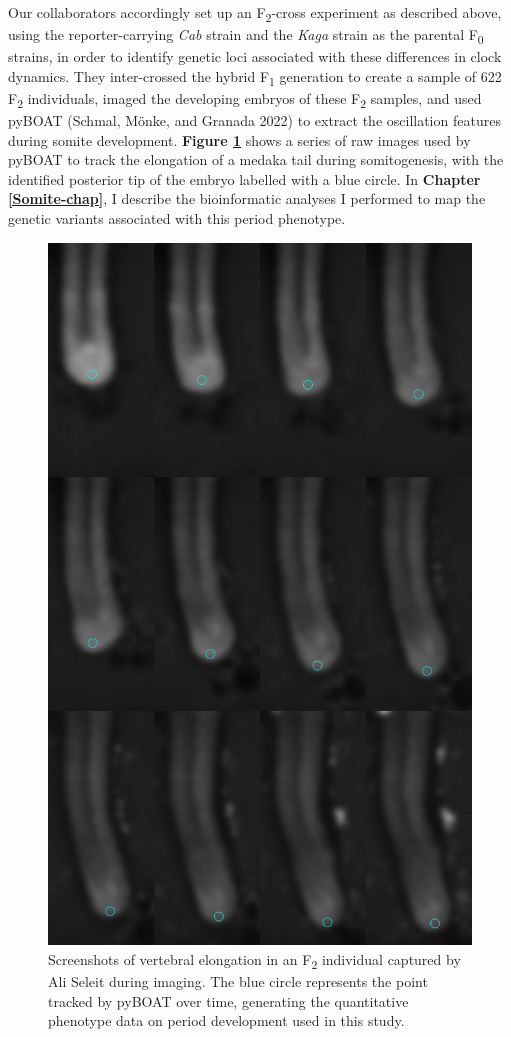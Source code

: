 \documentclass[
]{book}
\begin{document}
Our collaborators accordingly set up an F\textsubscript{2}-cross experiment as described above, using the reporter-carrying \emph{Cab} strain and the \emph{Kaga} strain as the parental F\textsubscript{0} strains, in order to identify genetic loci associated with these differences in clock dynamics. They inter-crossed the hybrid F\textsubscript{1} generation to create a sample of 622 F\textsubscript{2} individuals, imaged the developing embryos of these F\textsubscript{2} samples, and used pyBOAT (Schmal, Mönke, and Granada 2022) to extract the oscillation features during somite development. \textbf{Figure \ref{fig:somite-period-ali}} shows a series of raw images used by pyBOAT to track the elongation of a medaka tail during somitogenesis, with the identified posterior tip of the embryo labelled with a blue circle. In \textbf{Chapter \ref{Somite-chap}}, I describe the bioinformatic analyses I performed to map the genetic variants associated with this period phenotype.



\begin{figure}

{\centering \includegraphics[width=0.8\linewidth]{figs/somites/ali_compiled_somite_elong} 

}

\caption{Screenshots of vertebral elongation in an F\textsubscript{2} individual captured by Ali Seleit during imaging. The blue circle represents the point tracked by pyBOAT over time, generating the quantitative phenotype data on period development used in this study.}\label{fig:somite-period-ali}
\end{figure}
\end{document}
